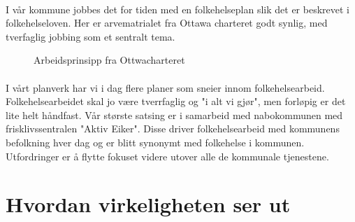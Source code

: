 \documentclass[11pt]{memoir} %
\begin{document}
		\paragraph{}
			I vår kommune jobbes det for tiden med en folkehelseplan slik det er beskrevet i folkehelseloven\cite{Folkehelseloven}. Her er arvematrialet fra Ottawa charteret\cite{ottawa} godt synlig, med tverfaglig jobbing som et sentralt tema. 

			  \begin{figure}[h]
                      \centering
                      \captionsetup{singlelinecheck=off}
                      \caption{Arbeidsprinsipp fra Ottwacharteret}
                    \end{figure}   
        \paragraph{}
        	I vårt planverk har vi i dag flere planer som sneier innom folkehelsearbeid. Folkehelsearbeidet skal jo være tverrfaglig og "i alt vi gjør", men forløpig er det lite helt håndfast. Vår største satsing er i samarbeid med nabokommunen med frisklivssentralen "Aktiv Eiker". Disse driver folkehelsearbeid med kommunens befolkning hver dag og er blitt synonymt med folkehelse i kommunen. Utfordringer er å flytte fokuset videre utover alle de kommunale tjenestene.

	\section{Hvordan virkeligheten ser ut}
\end{document}
